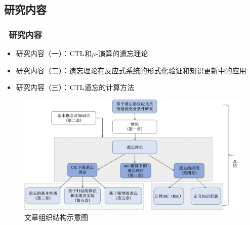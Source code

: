 \documentclass[aspectratio=1610, 9pt, CJK]{beamer}
\begin{document}
	\subsection{研究内容}

\begin{frame}
	\frametitle{~研究内容}
		\begin{itemize}
		\item  研究内容（一）：$\textrm{CTL}$和$\mu$-演算的遗忘理论
		\item 研究内容（二）：遗忘理论在反应式系统的形式化验证和知识更新中的应用
		\item 研究内容（三）：$\textrm{CTL}$遗忘的计算方法
	\end{itemize}
	\begin{figure}
		\includegraphics[scale=0.3]{figures/zuzhi}
		\caption{文章组织结构示意图}
	\end{figure}
\end{frame}
\end{document}

